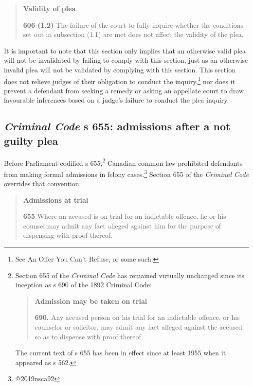 \begin{quote}
    \onehalfspacing
    \textbf{Validity of plea}
    
    \textbf{606 (1.2)} The failure of the court to fully inquire whether the conditions set out in subsection (1.1) are met does not affect the validity of the plea.
\end{quote}

It is important to note that this section only implies that an otherwise valid plea will not be invalidated by failing to comply with this section, just as an otherwise invalid plea will not be validated by complying with this section. This section does not relieve judges of their obligation to conduct the inquiry,\footnote{See An Offer You Can't Refuse, or some such.} nor does it prevent a defendant from seeking a remedy or asking an appellate court to draw favourable inferences based on a judge's failure to conduct the plea inquiry.

\subsection{\textit{Criminal Code} s 655: admissions after a not guilty plea}

Before Parliament codified s 655,\footnote{Section 655 of the \textit{Criminal Code} has remained virtually unchanged since its inception as s 690 of the 1892 Criminal Code:

\begin{quote}
    \textbf{Admission may be taken on trial}
    
    \textbf{690.} Any accused person on his trial for an indictable offence, or his counselor or solicitor, may admit any fact alleged against the accused so as to dispense with proof thereof.
\end{quote}

The current text of s 655 has been in effect since at least 1955 when it appeared as s 562.} Canadian common law prohibited defendants from making formal admissions in felony cases.\footnote{@2019nsca92} Section 655 of the \textit{Criminal Code} overrides that convention:

\begin{quote}
    \singlespacing
    \textbf{Admissions at trial}
    
    \textbf{655} Where an accused is on trial for an indictable offence, he or his counsel may admit any fact alleged against him for the purpose of dispensing with proof thereof.
\end{quote}

